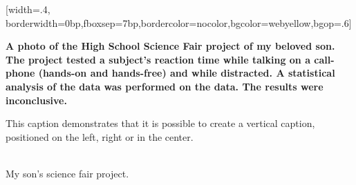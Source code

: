 \documentclass{article}
\begin{document}
\begin{center}
[width=.4\linewidth,%
     borderwidth=0bp,fboxsep=7bp,bordercolor=nocolor,bgcolor=webyellow,bgop=.6]{%
        \begin{minipage}[b][\graphicHeight-2\fboxsep-2\fboxrule]{\linewidth}\color{webbrown}\small\bfseries\parskip6pt
        A photo of the High School Science Fair project of my beloved son.
        The project tested a subject's reaction time while
        talking on a call-phone (hands-on and hands-free) and while
        distracted. A statistical analysis of the data was
        performed on the data. The results were inconclusive.

        This caption demonstrates that it is possible to create a vertical caption, positioned
        on the left, right or in the center.
        \end{minipage}
    }\\[6pt]
My son's science fair project.
\end{center}
\end{document}
